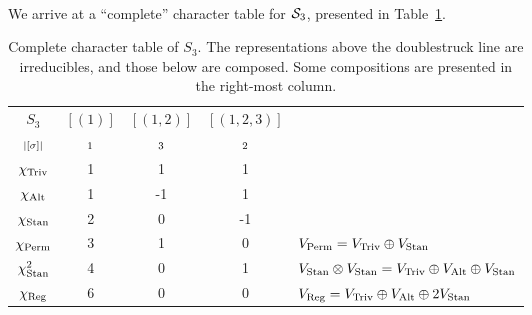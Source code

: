 	\paragraph{} We arrive at a ``complete'' character table for $\mathcal{S}_3$, presented in Table~\ref{table:completecharS3}.
	
	\begin{table}[hbt!]
		\centering
		
		\begin{tabular}{c | c c c | l}
			$S_3$         & $[(1)]$   & $[(1,2)]$  & $[(1,2,3)]$ &                                          \\
			$\scriptstyle|[\sigma]|$    & $\scriptstyle 1$ & $\scriptstyle 3$ & $\scriptstyle 2$ &         \\ \hline
			$\chi_{\text{Triv}}$       & 1       & 1       & 1       &                                          \\
			$\chi_{\text{Alt}}$       & 1       & -1      & 1       &                        \\
			$\chi_{\text{Stan}}$       & 2       & 0       & -1      &                                          \\ \hline\hline
			$\chi_{\text{Perm}}$       & 3       & 1       & 0       & $ V_{\text{Perm}} = V_{\text{Triv}} \oplus V_{\text{Stan}}$ \\
			$\chi_{\text{Stan}}^2$ & 4       & 0       & 1       & $ V_{\text{Stan}} \otimes V_{\text{Stan}} = V_{\text{Triv}} \oplus V_{\text{Alt}} \oplus V_{\text{Stan}}$ \\
			$\chi_{\text{Reg}}$       & 6       & 0       & 0       & $ V_{\text{Reg}} = V_{\text{Triv}} \oplus V_{\text{Alt}} \oplus 2V_{\text{Stan}}$
		\end{tabular}
			
		\caption{Complete character table of $S_3$. The representations above the doublestruck line are irreducibles, and those below are composed. Some compositions are presented in the right-most column.}
		\label{table:completecharS3}
	\end{table}

